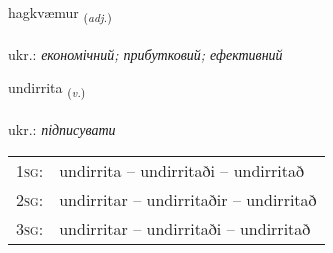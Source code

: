 \documentclass[frontgrid, backgrid]{flacards}\usepackage[]{graphicx}\usepackage[]{xcolor}
\begin{document}
\renewcommand{\flhead}{\vskip5pt \fboxsep=0pt {\small\bfseries\footnotesize Lýsingarorð | прикметник}}
\renewcommand{\fcfoot}{\vskip5pt \fboxsep=0pt \hspace{2pt}{\small\bfseries\footnotesize 2K}}

\renewcommand{\blhead}{\vskip5pt {\small\bfseries\footnotesize Lýsingarorð | прикметник }}
\renewcommand{\bcfoot}{\vskip5pt \hspace{2pt}{\small\bfseries\footnotesize 2K}}


{hagkvæmur \small{\textsubscript{(\textit{adj.})}} \\[1ex] %
\textphonetic{[haɣkʰvaimʏr]} \\
ukr.: \emph{економічний; прибутковий; ефективний} \\  [2ex]
\renewcommand*{\arraystretch}{0.8}
}

\renewcommand{\flhead}{\vskip5pt \fboxsep=0pt {\small\bfseries\footnotesize Sagnorð | дієслово}}
\renewcommand{\fcfoot}{\vskip5pt \fboxsep=0pt \hspace{2pt}{\small\bfseries\footnotesize 2K}}

\renewcommand{\blhead}{\vskip5pt {\small\bfseries\footnotesize Sagnorð | дієслово }}
\renewcommand{\bcfoot}{\vskip5pt \hspace{2pt}{\small\bfseries\footnotesize 2K}}


{undirrita \small{\textsubscript{(\textit{v.})}} \\[1ex] %
\textphonetic{[ʏntɪrɪta]} \\
ukr.: \emph{підписувати} \\  [2ex]
\renewcommand*{\arraystretch}{0.8}
\begin{tabular}{p{1cm}l}
\textsc{1sg}: & undirrita -- undirritaði -- undirritað \\ 
\textsc{2sg}: & undirritar -- undirritaðir -- undirritað \\ 
\textsc{3sg}: & undirritar -- undirritaði -- undirritað \\ 
\end{tabular}
}
\end{document}

